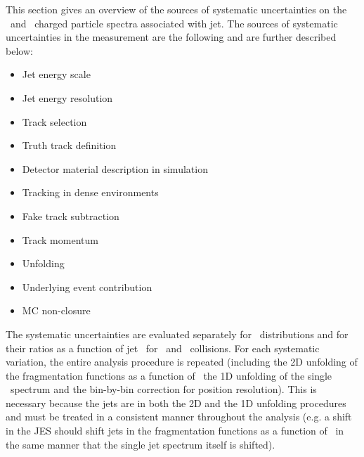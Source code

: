 
This section gives an overview of the sources of systematic uncertainties on the \pp\ and \pbpb\ charged particle spectra associated with jet. The sources of systematic uncertainties in the measurement are the following and are further described below:

\begin{itemize}

\item Jet energy scale

\item Jet energy resolution

\item Track selection

\item Truth track definition

\item Detector material description in simulation

\item Tracking in dense environments

\item Fake track subtraction

\item Track momentum

\item Unfolding

\item Underlying event contribution

\item MC non-closure

\end{itemize}

The systematic uncertainties are evaluated separately for \Dptr\ distributions and for their ratios as a function of jet \pT\ for \pp\ and \pbpb\ collisions. For each systematic variation, the entire analysis procedure is repeated (including the 2D unfolding of the fragmentation
functions as a function of \ptjet\, the 1D unfolding of the single \ptjet\ spectrum and the bin-by-bin correction for position resolution). This is necessary because the jets are in both the 2D and the 1D unfolding procedures and must be treated in a consistent manner throughout the analysis (e.g. a shift in the JES should 
shift jets in the fragmentation functions as a function of \ptjet\ in the same manner
that the single jet spectrum itself is shifted).

